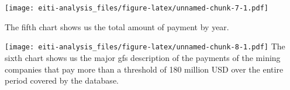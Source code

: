 \documentclass[]{article}
\newenvironment{Shaded}{\begin{snugshade}}{\end{snugshade}}
\newcommand{\DataTypeTok}[1]{\textcolor[rgb]{0.13,0.29,0.53}{#1}}
\newcommand{\KeywordTok}[1]{\textcolor[rgb]{0.13,0.29,0.53}{\textbf{#1}}}
\newcommand{\NormalTok}[1]{#1}
\newcommand{\OperatorTok}[1]{\textcolor[rgb]{0.81,0.36,0.00}{\textbf{#1}}}
\newcommand{\StringTok}[1]{\textcolor[rgb]{0.31,0.60,0.02}{#1}}
\begin{document}
\texttt{[image: eiti-analysis\_files/figure-latex/unnamed-chunk-7-1.pdf]}

The fifth chart shows us the total amount of payment by year.

\begin{Shaded}
\end{Shaded}

\texttt{[image: eiti-analysis\_files/figure-latex/unnamed-chunk-8-1.pdf]}
The sixth chart shows us the major gfs description of the payments of
the mining companies that pay more than a threshold of 180 million USD
over the entire period covered by the database.
\end{document}
